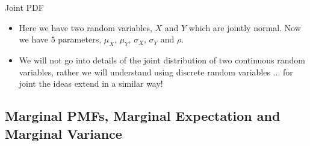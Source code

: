 \documentclass[8pt, usepdftitle=false]{beamer}
\begin{document}
\begin{frame}[allowframebreaks]{Joint PDF}
\begin{itemize}
	\item Here we have two random variables, $X$ and $Y$ which are jointly normal. Now we have $5$ parameters, $\mu_X$, $\mu_Y$, $\sigma_X$, $\sigma_Y$ and $\rho$. 

	\item We will not go into details of the joint distribution of two continuous random variables, rather we will understand using discrete random variables ... for joint the ideas extend in a similar way!







\end{itemize}


\end{frame}


\subsection{Marginal PMFs, Marginal Expectation and Marginal Variance}
\frame{\subsectionpage}










\end{document}
